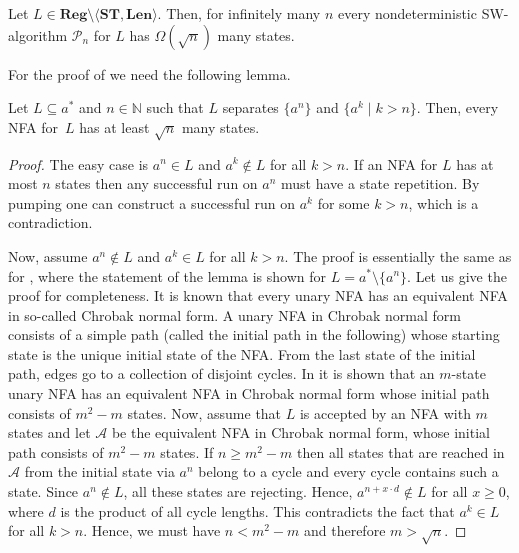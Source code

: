 \documentclass{theoretics}
\newcommand{\N}{\mathbb{N}}
\newcommand{\A}{\mathcal{A}}
\renewcommand{\P}{\mathcal{P}}
\newcommand{\Reg}{\mathbf{Reg}}
\newcommand{\Len}{\mathbf{Len}}
\newcommand{\ST}{\mathbf{ST}}
\renewcommand{\geq}{\geqslant}
\begin{document}
\begin{proposition} \label{prop-lower-sqrt}
	Let $L \in \Reg \setminus \langle \ST, \Len \rangle$.
	Then, for infinitely many $n$ every nondeterministic SW-algorithm $\P_n$ for $L$ has $\Omega(\sqrt{n})$ many states.
\end{proposition}

For the proof of  we need the following lemma.

\begin{lemma} \label{lemma-NFA-lower}
Let $L \subseteq a^*$ and $n \in \N$ such that
$L$ separates $\{a^n\}$ and $\{a^k \mid k > n\}$.
Then, every NFA for~$L$ has at least $\sqrt{n}$ many states.
\end{lemma}

\begin{proof}
The easy case is $a^n \in L$ and $a^k \notin L$ for all $k > n$.
If an NFA for $L$ has at most $n$ states then any successful run on $a^n$
must have a state repetition.
By pumping one can construct a successful run on $a^k$ for some $k > n$, which is a contradiction.

Now, assume $a^n \notin L$ and $a^k \in L$ for all $k > n$.
The proof is essentially the same as for \cite[Lemma~6]{JiraskovaM14}, where the statement of the lemma is shown for $L = a^* \setminus \{a^n\}$.
Let us give the proof for completeness. 
It is known that every unary NFA has an equivalent NFA in so-called Chrobak normal form.  A unary NFA in Chrobak normal
form consists of a simple path (called the initial path in the following) whose starting state is the unique initial state of the NFA. 
From  the last state of the initial path, edges go to a collection of 
disjoint cycles. In \cite{Gawrychowski11} it is shown that an $m$-state unary NFA has an equivalent NFA in Chrobak normal form whose
initial path consists of $m^2 - m$ states. Now, assume that $L$ is accepted by an NFA with $m$ states and let $\A$ 
be the equivalent NFA in Chrobak normal form, whose initial path consists of $m^2-m$ states. If $n \geq m^2-m$ then all states
that are reached in $\A$ from the initial state via $a^n$ belong to a cycle and every cycle contains such a state. Since
$a^n \notin L$, all these states are rejecting. Hence, $a^{n+ x \cdot d} \notin L$ for all $x \geq 0$, where $d$ is the product
of all cycle lengths. This contradicts the fact that $a^k \in L$ for all $k > n$. Hence, we must have $n < m^2-m$ and therefore
$m > \sqrt{n}$.
\end{proof}
\end{document}
